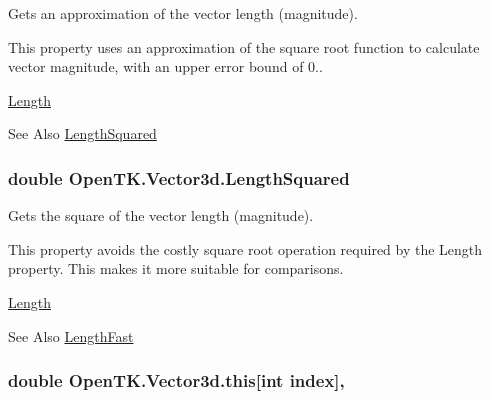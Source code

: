Gets an approximation of the vector length (magnitude). 

This property uses an approximation of the square root function to calculate vector magnitude, with an upper error bound of 0.. 

\hyperlink{struct_open_t_k_1_1_vector3d_a554332540dcf9bac5720fdb26d5e96c2}{Length} \begin{DoxySeeAlso}{See Also}
\hyperlink{struct_open_t_k_1_1_vector3d_aaad32d6807957c3db9e5d32f00571e70}{Length\-Squared}


\end{DoxySeeAlso}
\hypertarget{struct_open_t_k_1_1_vector3d_aaad32d6807957c3db9e5d32f00571e70}{
\subsubsection[{Length\-Squared}]{\setlength{\rightskip}{0pt plus 5cm}double Open\-T\-K.\-Vector3d.\-Length\-Squared\hspace{0.3cm}{\ttfamily [get]}}}\label{struct_open_t_k_1_1_vector3d_aaad32d6807957c3db9e5d32f00571e70}


Gets the square of the vector length (magnitude). 

This property avoids the costly square root operation required by the Length property. This makes it more suitable for comparisons. 

\hyperlink{struct_open_t_k_1_1_vector3d_a554332540dcf9bac5720fdb26d5e96c2}{Length} \begin{DoxySeeAlso}{See Also}
\hyperlink{struct_open_t_k_1_1_vector3d_ae08ae4196dadb5dfb4baf0ab27b1ee57}{Length\-Fast}


\end{DoxySeeAlso}
\hypertarget{struct_open_t_k_1_1_vector3d_a0052ef76359efe834947565dcabe91fc}{
\subsubsection[{this[int index]}]{\setlength{\rightskip}{0pt plus 5cm}double Open\-T\-K.\-Vector3d.\-this\mbox{[}int index\mbox{]}\hspace{0.3cm}{\ttfamily [get]}, {\ttfamily [set]}}}\label{struct_open_t_k_1_1_vector3d_a0052ef76359efe834947565dcabe91fc}


